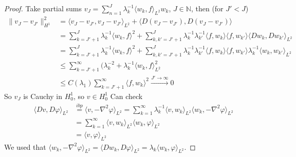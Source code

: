 \documentclass{article}
\theoremstyle{definition}
\theoremstyle{remark}
\theoremstyle{plain}
\newcommand{\NN}{\mathbb{N}}
\begin{document}
\begin{proof}
    Take partial sums $v_J=\sum_{n=1}^J\lambda_k^{-1}\langle w_k,f\rangle_{L^2}w_k$, $J\in\NN$, then (for $J'<J$) 
    \begin{align*}
        \|v_J-v_{J'}\|_{H^1}^2&=\langle v_J-v_{J'},v_J-v_{J'}\rangle_{L^2}+\langle D(v_J-v_{J'}),D(v_J-{v_{J'}})\rangle\\
        &=\sum_{k=J'+1}^J\lambda_k^{-1}\langle w_k,f\rangle^2+\sum_{k,k'=J'+1}^J\lambda_k^{-1}\lambda_{k'}^{-1}\langle f,w_k\rangle\langle f,w_{k'}\rangle\langle Dw_k,Dw_{k'}\rangle_{L^2}\\
        &=\sum_{k=J'+1}^J\lambda_k^{-1}\langle w_k,f\rangle^2+\sum_{k,k'=J'+1}^J\lambda_k^{-1}\lambda_{k'}^{-1}\langle f,w_k\rangle\langle f,w_{k'}\rangle\lambda_k^{-1}\langle w_k,w_{k'}\rangle_{L^2}\\
        &\le \sum_{k=J'+1}^\infty(\lambda_k^{-2}+\lambda_k^{-1}\langle w_k,f\rangle_{L^2}^2\\
        &\le C(\lambda_1)\sum_{k=J'+1}^\infty\langle f,w_k\rangle^2\overset{J'\to\infty}{\longrightarrow}0
    \end{align*}
    So $v_J$ is Cauchy in $H_0^1$, so $v\in H_0^1$
    Can check
    \begin{align*}
        \langle Dv,D\varphi\rangle_{L^2}&\overset{ibp}{=}\langle v,-\nabla^2\varphi\rangle_{L^2}=\sum_{k=1}^\infty\lambda_k^{-1}\langle v,w_k\rangle_{L^2}\langle w_{k},-\nabla^2\varphi\rangle_{L^2}\\
        &=\sum_{k=1}^\infty\langle v,w_k\rangle_{L^2}\langle w_k,\varphi\rangle_{L^2}\\
        &=\langle v,\varphi\rangle_{L^2}
    \end{align*}
    We used that $\langle w_k,-\nabla^2\varphi\rangle_{L^2}=\langle Dw_k,D\varphi\rangle_{L^2}=\lambda_k\langle w_k,\varphi\rangle_{L^2}$.
\end{proof}
\end{document}
